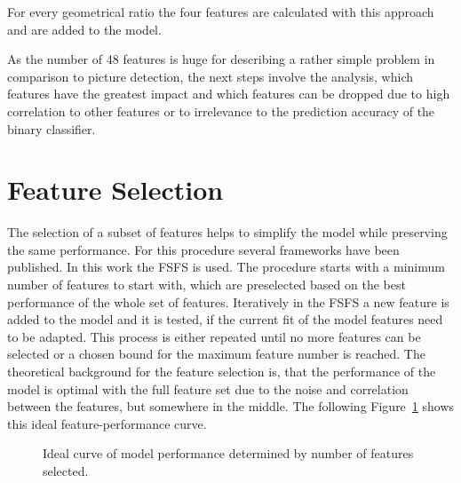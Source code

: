 For every geometrical ratio the four features are calculated with this approach and are added to the model.

\parbreak

As the number of 48 features is huge for describing a rather simple problem in comparison to picture detection, the next steps
involve the analysis, which features have the greatest impact and which features can be dropped due to high correlation to other
features or to irrelevance to the prediction accuracy of the binary classifier.

\section{Feature Selection}
\label{sec:feature_engineering}

The selection of a subset of features helps to simplify the model
while preserving the same performance. For this procedure several frameworks have been published. In this work
the \gls{FSFS} is used. The procedure starts with a minimum number of features to start with, which are
preselected based on the best performance of the whole set of features. Iteratively in the \gls{FSFS} a new
feature is added to the model and it is tested, if the current fit of the model features need to be adapted.
This process is either repeated until no more features can be selected or a chosen bound for the maximum
feature number is reached. The theoretical background for the feature selection is, that the performance
of the model is optimal with the full feature set due to the noise and correlation between the features,
but somewhere in the middle. The following Figure~\ref{fig:feature-performance} shows this ideal feature-performance curve.

\begin{figure}[ht]
    \centering
    \caption{Ideal curve of model performance determined by number of features selected.}
    \label{fig:feature-performance}
\end{figure}

